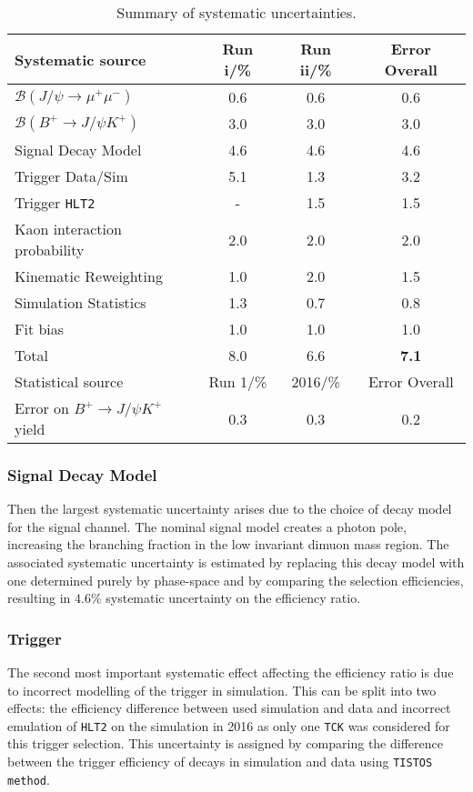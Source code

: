 \begin{table}[H]
\centering
\begin{tabular}{ l  c  c  c  }
\toprule
Systematic source & Run \Rn{1}/\% &  Run \Rn{2}/\% & Error Overall \\ \hline

$\mathcal{B}(J/\psi \rightarrow \mu^{+} \mu^{-})$ & 0.6 & 0.6 & 0.6\\
$\mathcal{B}(B^{+} \rightarrow  J/\psi K^{+})$ & 3.0 & 3.0 & 3.0\\
\hline
Signal Decay Model & 4.6 & 4.6 & 4.6\\
Trigger Data/Sim & 5.1 & 1.3& 3.2\\
Trigger \texttt{HLT2} &  -  &  1.5& 1.5\\
Kaon interaction probability &  2.0  &  2.0& 2.0\\
Kinematic Reweighting & 1.0 & 2.0 &1.5\\
Simulation Statistics & 1.3 & 0.7 & 0.8 \\
Fit bias & 1.0 & 1.0 & 1.0  \\
 \hline
 Total & 8.0 & 6.6 & \textbf{7.1} \\
 \hline
Statistical source & Run 1/\% & 2016/\% & Error Overall \\ \hline
Error on $B^{+} \rightarrow J/\psi K^{+}$ yield & 0.3 & 0.3 & 0.2\\
 \bottomrule
\end{tabular}
\caption{Summary of systematic uncertainties.}
\label{tab:systematicsummary}
\end{table}




\subsubsection{Signal Decay Model}
Then the largest systematic uncertainty arises due to the choice of decay model for the signal channel.
The nominal signal model creates a photon pole, increasing the branching fraction in the low invariant dimuon mass region.
The associated systematic uncertainty is estimated by replacing this decay model with one determined purely by phase-space and by comparing the selection efficiencies, resulting in $4.6\%$ systematic uncertainty on the efficiency ratio. %

\subsubsection{Trigger}
The second most important systematic effect affecting the efficiency ratio is due to incorrect modelling of the trigger in simulation. This can be split into two effects:
 the efficiency difference between used simulation and data and incorrect emulation of \texttt{HLT2} on the simulation in 2016 as only one \texttt{TCK} was considered for this trigger selection. This uncertainty is assigned by comparing the difference between the trigger efficiency of \bjpsimumuk decays in simulation and data using \texttt{TISTOS method}.

